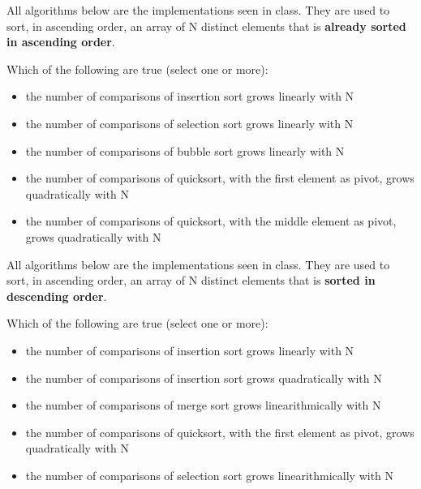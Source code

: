\begin{question}
All algorithms below are the implementations seen in class. They are used to sort, in ascending order, an array of N distinct elements that is \textbf{already sorted in ascending order}.

Which of the following are true (select one or more):
\begin{itemize}[leftmargin=2em,itemsep=1pt,topsep=2pt]
\item[\cb{1}] the number of comparisons of insertion sort grows linearly with N
\item[\cb{0}] the number of comparisons of selection sort grows linearly with N
\item[\cb{0}] the number of comparisons of bubble sort grows linearly with N
\item[\cb{1}] the number of comparisons of quicksort, with the first element as pivot, grows quadratically with N
\item[\cb{0}] the number of comparisons of quicksort, with the middle element as pivot, grows quadratically with N
\end{itemize}
\end{question}

\begin{question}
All algorithms below are the implementations seen in class. They are used to sort, in ascending order, an array of N distinct elements that is \textbf{sorted in descending order}.

Which of the following are true (select one or more):
\begin{itemize}[leftmargin=2em,itemsep=1pt,topsep=2pt]
\item[\cb{0}] the number of comparisons of insertion sort grows linearly with N
\item[\cb{1}] the number of comparisons of insertion sort grows quadratically with N
\item[\cb{1}] the number of comparisons of merge sort grows linearithmically with N
\item[\cb{1}] the number of comparisons of quicksort, with the first element as pivot, grows quadratically with N
\item[\cb{0}] the number of comparisons of selection sort grows linearithmically with N
\end{itemize}
\end{question}



